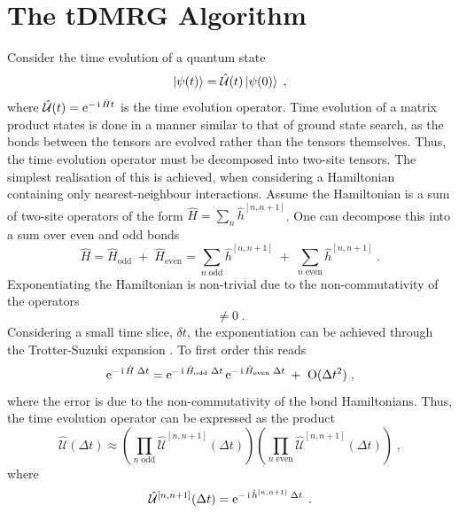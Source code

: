 \section{The tDMRG Algorithm}
Consider the time evolution of a quantum state
\begin{equation}
	\ket{\psi (t)} = \hat{\mathcal{U}}(t) \ket{\psi (0)} \; ,
\end{equation}
where $\hat{\mathcal{U}}(t) = \operatorname{e}^{ - \operatorname{i} \hat{H} t }$ is the time evolution operator. 
Time evolution of a matrix product states is done in a manner similar to that of ground state search, as the bonds between the tensors are evolved rather than the tensors themselves. Thus, the time evolution operator must be decomposed into two-site tensors. The simplest realisation of this is achieved, when considering a Hamiltonian containing only nearest-neighbour interactions.
Assume the Hamiltonian is a sum of two-site operators of the form $\hat{H} = \sum_{n} \hat{h}^{[n , n+1]}$. One can decompose this into a sum over even and odd bonds
\begin{equation}
	\hat{H} = \hat{H}_{\mathrm{odd}} \; + \; \hat{H}_{\mathrm{even}} = \sum_{n \; \mathrm{odd}} \hat{h}^{[n , n+1]} \; + \; \sum_{n \; \mathrm{even}} \hat{h}^{[n , n+1]} \; .
\end{equation}  
Exponentiating the Hamiltonian is non-trivial due to the non-commutativity of the operators
\begin{equation}
	[ \hat{h}_{\mathrm{odd}}^{[n , n+1]} \; , \; \hat{h}_{\mathrm{even}}^{[n , n+1]} ] \neq 0 \; .
\end{equation}
Considering a small time slice, $\delta t$, the exponentiation can be achieved through the Trotter-Suzuki expansion \cite{Suzuki}. To first order this reads
\begin{equation}
	\operatorname{e}^{- \operatorname{i} \hat{H} \; \Delta t} = \operatorname{e}^{- \operatorname{i} \hat{H}_{\mathrm{odd}} \; \Delta t } \operatorname{e}^{- \operatorname{i} \hat{H}_{\mathrm{even}} \; \Delta t} \; + \; \;  \mathrm{O}(\Delta t^2) \; ,
\end{equation}
where the error is due to the non-commutativity of the bond Hamiltonians. Thus, the time evolution operator can be expressed as the product
\begin{equation}
	\hat{\mathcal{U}}(\Delta t) \approx \left( \prod_{n \; \mathrm{odd}} \hat{\mathcal{U}}^{[n,n+1]} (\Delta t) \right) \left( \prod_{n \; \mathrm{even}} \hat{\mathcal{U}}^{[n,n+1]} (\Delta t) \right) \; ,
\end{equation}
where
\begin{equation}
	\hat{\mathcal{U}}^{[n,n+1]} (\Delta t) = \operatorname{e}^{- \operatorname{i} \hat{h}^{[n , n+1]} \; \Delta t } \; .
\end{equation}
